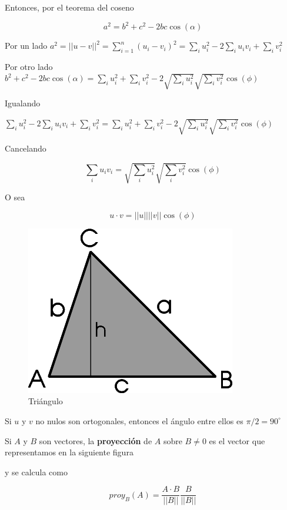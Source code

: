 \begin{definition}
Entonces, por el teorema del coseno

$$ \boxed{a^2 = b^2 + c^2 - 2bc \cos(\alpha)} $$

Por un lado $a^2 = || u-v ||^2 = \sum_{i=1}^n (u_i - v_i)^2 = \sum_i u_i^2 - 2 \sum_i u_i v_i + \sum_i v_i^2$

Por otro lado $b^2 + c^2 - 2bc \cos(\alpha) = \sum_i u_i^2 + \sum_i v_i^2 - 2 \sqrt{ \sum_i u_i^2 } \sqrt{ \sum_i v_i^2 } \cos(\phi)$

Igualando

$\sum_i u_i^2 - 2 \sum_i u_i v_i + \sum_i v_i^2 = \sum_i u_i^2 + \sum_i v_i^2 - 2 \sqrt{ \sum_i u_i^2 } \sqrt{ \sum_i v_i^2 } \cos(\phi)$

Cancelando

$$ \sum_i u_i v_i = \sqrt{ \sum_i u_i^2 } \sqrt{ \sum_i v_i^2 } \cos(\phi)$$

O sea

$$ u \cdot v = ||u|| ||v|| \cos(\phi)$$

\end{definition}

\begin{figure}[h]
\centering\includegraphics[scale=0.4]{images/01_precalculo/teorema_seno.png}
\caption{Triángulo}
\end{figure}

\begin{observation}
Si $u$ y $v$ no nulos son ortogonales, entonces el ángulo entre ellos es $\pi/2 = 90^{\circ}$
\end{observation}

\begin{definition}[Proyección] 
Si $A$ y $B$ son vectores, la \textbf{proyección} de $A$ sobre $B \neq 0$ es el vector que representamos en la siguiente figura

y se calcula como

$$ proy_B(A) = \frac{A \cdot B}{||B||} \frac{B}{||B||}$$

\end{definition}

